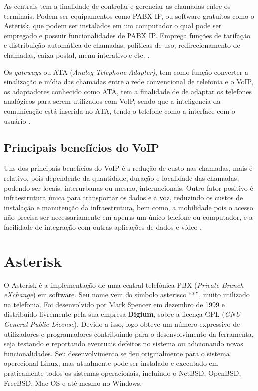 As centrais tem a finalidade de controlar e gerenciar as chamadas entre os terminais. Podem ser equipamentos como PABX IP, ou software gratuitos como o Asterisk, que podem ser instalados em um computador o qual pode ser empregado e possuir funcionalidades de PABX IP. Emprega funções de tarifação e distribuição automática de chamadas, políticas de uso, redirecionamento de chamadas, caixa postal, menu interativo e etc. \cite{alexandrekeller2014}.

Os \textit{gateways} ou ATA (\textit{Analog Telephone Adapter)}, tem como função converter a sinalização e mídia das chamadas entre a rede convencional de telefonia e o VoIP, os adaptadores conhecido como ATA, tem a finalidade de de adaptar os telefones analógicos para serem utilizados com VoIP, sendo que a inteligencia da comunicação está inserida no ATA, tendo o telefone como a interface com o usuário \cite{eduardomaronasmonks2006}.


\subsection{Principais benefícios do VoIP}
Uns dos principais benefícios do VoIP é a redução de custo nas chamadas, mais é relativo, pois dependente da quantidade, duração e localidade das chamadas, podendo ser locais, interurbanas ou mesmo, internacionais. Outro fator positivo é infraestrutura única para transportar os dados e a voz,  reduzindo os custos de instalação e manutenção da infraestrutura, bem como, a mobilidade pois o acesso não precisa ser necessariamente em apenas
um único telefone ou computador, e a facilidade de integração com outras aplicações de dados e vídeo \cite{djaneelmajoanine2007}.

\section{Asterisk}
O Asterisk é a implementação de uma central telefônica PBX (\textit{Private Branch eXchange}) em software. Seu nome vem do símbolo asterisco ``*'', muito utilizado na telefonia. Foi desenvolvido por Mark Spencer em dezembro de 1999 e distribuído livremente pela sua empresa \textbf{Digium}, sobre a licença GPL (\textit{GNU General Public License}). Devido a isso, logo obteve um número expressivo de utilizadores e programadores contribuindo para o desenvolvimento da ferramenta, seja testando e reportando eventuais defeitos no sistema ou adicionando novas funcionalidades. Seu desenvolvimento se deu originalmente para o sistema operecional Linux, mas atualmente pode ser instalado e executado em praticamente todos os sistemas operacionais, incluindo o NetBSD, OpenBSD, FreeBSD, Mac OS e até mesmo no Windows. \cite{alexandrekeller2014}

